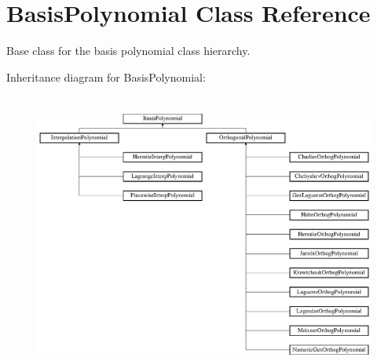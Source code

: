 \section{Basis\+Polynomial Class Reference}
\label{classPecos_1_1BasisPolynomial}


Base class for the basis polynomial class hierarchy.  


Inheritance diagram for Basis\+Polynomial\+:\begin{figure}[H]
\begin{center}
\leavevmode
\includegraphics[height=9.333334cm]{classPecos_1_1BasisPolynomial}
\end{center}
\end{figure}

